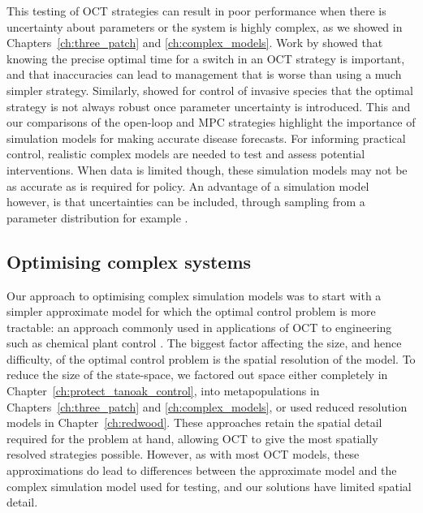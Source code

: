 This testing of OCT strategies can result in poor performance when there is uncertainty about parameters or the system is highly complex, as we showed in Chapters~\ref{ch:three_patch} and \ref{ch:complex_models}. Work by \citet{forster_optimizing_2007} showed that knowing the precise optimal time for a switch in an OCT strategy is important, and that inaccuracies can lead to management that is worse than using a much simpler strategy. Similarly, \citet{carrasco_optimal_2009} showed for control of invasive species that the optimal strategy is not always robust once parameter uncertainty is introduced. This and our comparisons of the open-loop and MPC strategies highlight the importance of simulation models for making accurate disease forecasts. For informing practical control, realistic complex models are needed to test and assess potential interventions. When data is limited though, these simulation models may not be as accurate as is required for policy. An advantage of a simulation model however, is that uncertainties can be included, through sampling from a parameter distribution for example \citep[e.g.][]{cook_constructing_2008,parry_bayesian_2014,cunniffe_optimising_2015}.

\subsection{Optimising complex systems}

Our approach to optimising complex simulation models was to start with a simpler approximate model for which the optimal control problem is more tractable: an approach commonly used in applications of OCT to engineering such as chemical plant control \citep{lee_model_2011}. The biggest factor affecting the size, and hence difficulty, of the optimal control problem is the spatial resolution of the model. To reduce the size of the state-space, we factored out space either completely in Chapter~\ref{ch:protect_tanoak_control}, into metapopulations in Chapters~\ref{ch:three_patch} and \ref{ch:complex_models}, or used reduced resolution models in Chapter~\ref{ch:redwood}. These approaches retain the spatial detail required for the problem at hand, allowing OCT to give the most spatially resolved strategies possible. However, as with most OCT models, these approximations do lead to differences between the approximate model and the complex simulation model used for testing, and our solutions have limited spatial detail.

